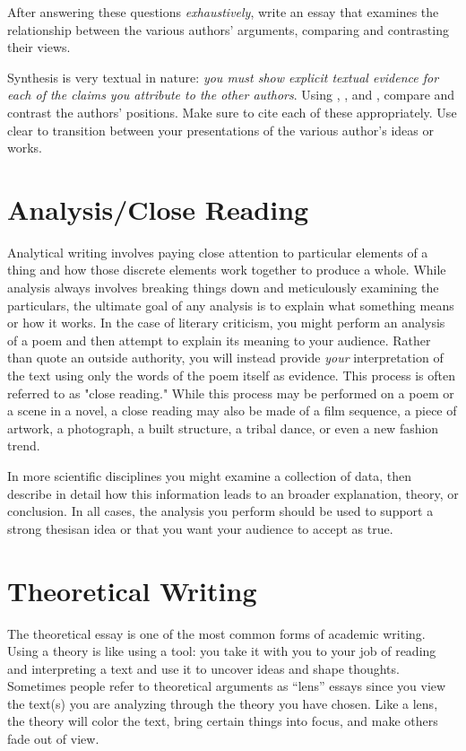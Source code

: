 \noindent After answering these questions \emph{exhaustively}, write an essay
that examines the relationship between the various authors’ arguments, comparing
and contrasting their views.


Synthesis is very textual in nature: \emph{you must show explicit textual
evidence for each of the claims you attribute to the other authors}. Using
\hyperlink{summary}{\color{Ahrenge}{summary}},
\hyperlink{paraphrase}{\color{Ahrenge}{paraphrase}}, and
\hyperlink{quotation}{\color{Ahrenge}{quotation}}, compare and contrast the
authors’ positions. Make sure to cite each of these appropriately. Use clear
\hyperlink{signalphrase}{\color{Ahrenge}{signal phrases}} to transition between
your presentations of the various author’s ideas or works.




\hypertarget{closereadingessay}{} \section{Analysis/Close Reading} Analytical
writing involves paying close attention to particular elements of a thing and
how those discrete elements work together to produce a whole. While analysis
always involves breaking things down and meticulously examining the particulars,
the ultimate goal of any analysis is to explain what something means or how it
works. In the case of literary criticism, you might perform an analysis of a
poem and then attempt to explain its meaning to your audience.  Rather than
quote an outside authority, you will instead provide \emph{your} interpretation
of the text using only the words of the poem itself as evidence. This process is
often referred to as "close reading." While this process may be performed on a
poem or a scene in a novel, a close reading may also be made of a film
sequence, a piece of artwork, a photograph, a built structure, a tribal dance, or
even a new fashion trend.

In more scientific disciplines you might examine a collection of data, then
describe in detail how this information leads to an broader explanation, theory,
or conclusion. In all cases, the analysis you perform should be used to support
a strong thesis\textemdash an idea or that you want your audience to accept as
true.

\hypertarget{theoreticalessay}{} \section{Theoretical Writing} The theoretical
essay is one of the most common forms of academic writing. Using a theory is
like using a tool: you take it with you to your job of reading and interpreting
a text and use it to uncover ideas and shape thoughts. Sometimes people refer to
theoretical arguments as “lens” essays since you view the text(s) you are
analyzing through the theory you have chosen. Like a lens, the theory will color
the text, bring certain things into focus, and make others fade out of view.

